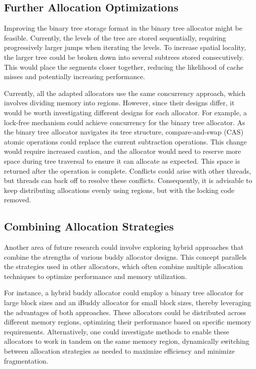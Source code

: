\newpage
\subsection{Further Allocation Optimizations} \label{sec:futureworkOptimizations}
Improving the binary tree storage format in the binary tree allocator might be feasible. Currently, the levels of the tree are stored sequentially, requiring progressively larger jumps when iterating the levels. To increase spatial locality, the larger tree could be broken down into several subtrees stored consecutively. This would place the segments closer together, reducing the likelihood of cache misses and potentially increasing performance.

Currently, all the adapted allocators use the same concurrency approach, which involves dividing memory into regions. However, since their designs differ, it would be worth investigating different designs for each allocator. For example, a lock-free mechanism could achieve concurrency for the binary tree allocator. As the binary tree allocator navigates its tree structure, compare-and-swap (CAS) atomic operations could replace the current subtraction operations. This change would require increased caution, and the allocator would need to reserve more space during tree traversal to ensure it can allocate as expected. This space is returned after the operation is complete. Conflicts could arise with other threads, but threads can back off to resolve these conflicts. Consequently, it is advisable to keep distributing allocations evenly using regions, but with the locking code removed.

% 

\subsection{Combining Allocation Strategies} \label{sec:futureworkCombine}
Another area of future research could involve exploring hybrid approaches that combine the strengths of various buddy allocator designs. This concept parallels the strategies used in other allocators, which often combine multiple allocation techniques to optimize performance and memory utilization.

For instance, a hybrid buddy allocator could employ a binary tree allocator for large block sizes and an iBuddy allocator for small block sizes, thereby leveraging the advantages of both approaches. These allocators could be distributed across different memory regions, optimizing their performance based on specific memory requirements. Alternatively, one could investigate methods to enable these allocators to work in tandem on the same memory region, dynamically switching between allocation strategies as needed to maximize efficiency and minimize fragmentation.
